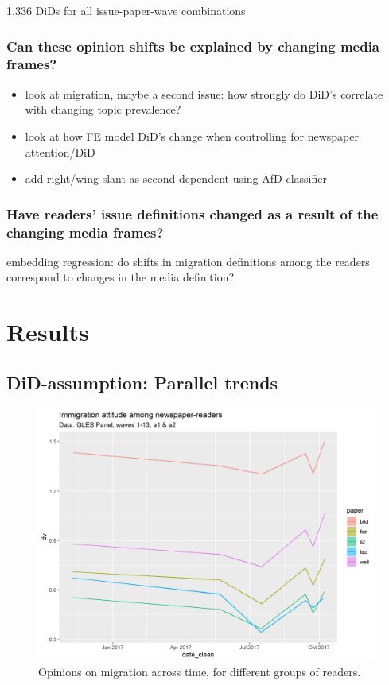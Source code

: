 \documentclass{article}
\begin{document}
1,336 DiDs for all issue-paper-wave combinations

\subsubsection{Can these opinion shifts be explained by changing media frames?}

\begin{itemize}
    \item look at migration, maybe a second issue: how strongly do DiD's correlate with changing topic prevalence?
    \item look at how FE model DiD's change when controlling for newspaper attention/DiD
    \item add right/wing slant as second dependent using AfD-classifier
\end{itemize}


\subsubsection{Have readers' issue definitions changed as a result of the changing media frames?}

embedding regression: do shifts in migration definitions among the readers correspond to changes in the media definition?

\section{Results}

\subsection{DiD-assumption: Parallel trends}

\begin{figure}[!h]
    \centering
    \includegraphics[width=\textwidth]{paper/vis/Immigration_papers.png}
    \caption{Opinions on migration across time, for different groups of readers.}
    \label{fig:issues}
\end{figure}
    
\end{document}
